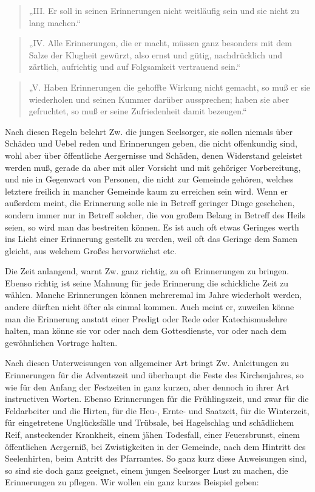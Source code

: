 \begin{quote}
„III. Er soll in seinen Erinnerungen nicht weitläufig sein und sie nicht zu lang machen.“
\end{quote}

\begin{quote}
„IV. Alle Erinnerungen, die er macht, müssen ganz besonders mit dem Salze der Klugheit gewürzt, also ernst und gütig, nachdrücklich und zärtlich, aufrichtig und auf Folgsamkeit vertrauend sein.“
\end{quote}

\begin{quote}
„V. Haben Erinnerungen die gehoffte Wirkung nicht gemacht, so muß er sie wiederholen und seinen Kummer darüber
aussprechen; haben sie aber gefruchtet, so muß er seine Zufriedenheit damit bezeugen.“
\end{quote}

Nach diesen Regeln belehrt Zw. die jungen Seelsorger, sie sollen niemals über Schäden und Uebel reden und Erinnerungen geben, die nicht offenkundig sind, wohl aber über öffentliche Aergernisse und Schäden, denen Widerstand geleistet werden muß, gerade da aber mit aller Vorsicht und mit gehöriger Vorbereitung, und nie in Gegenwart von Personen, die nicht zur Gemeinde gehören, welches letztere freilich in mancher Gemeinde kaum zu erreichen sein wird. Wenn er außerdem meint, die Erinnerung solle nie in Betreff geringer Dinge geschehen, sondern immer nur in Betreff solcher, die von großem Belang in Betreff des Heils seien, so wird man das bestreiten können. Es ist auch oft etwas Geringes werth ins Licht einer Erinnerung gestellt zu werden, weil oft das Geringe dem Samen gleicht, aus welchem Großes hervorwächst etc.

Die Zeit anlangend, warnt Zw. ganz richtig, zu oft Erinnerungen zu bringen. Ebenso richtig ist seine Mahnung für jede Erinnerung die schickliche Zeit zu wählen. Manche Erinnerungen können mehreremal im Jahre wiederholt werden, andere dürften nicht öfter als einmal kommen. Auch meint er, zuweilen könne man die Erinnerung anstatt einer Predigt oder Rede oder Katechismuslehre halten, man könne sie vor oder nach dem Gottesdienste, vor oder nach dem gewöhnlichen Vortrage halten.

Nach diesen Unterweisungen von allgemeiner Art bringt
Zw. Anleitungen zu Erinnerungen für die Adventszeit und überhaupt die Feste des Kirchenjahres, so wie für den Anfang der Festzeiten in ganz kurzen, aber dennoch in ihrer Art instructiven Worten. Ebenso Erinnerungen für die Frühlingszeit, und zwar für die Feldarbeiter und die Hirten, für die Heu-, Ernte- und Saatzeit, für die Winterzeit, für eingetretene Unglücksfälle und Trübsale, bei Hagelschlag und schädlichem Reif, ansteckender Krankheit, einem jähen Todesfall, einer Feuersbrunst, einem öffentlichen Aergerniß, bei Zwistigkeiten in der Gemeinde, nach dem Hintritt des Seelenhirten, beim Antritt des Pfarramtes. So ganz kurz diese Anweisungen sind, so sind sie doch ganz geeignet, einem jungen Seelsorger Lust zu machen, die Erinnerungen zu pflegen. Wir wollen ein ganz kurzes Beispiel geben:

